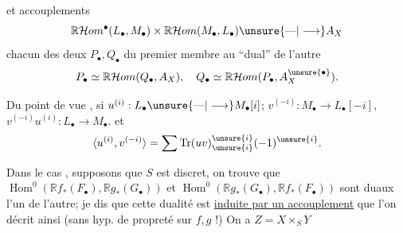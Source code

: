 
et  accouplements 
\[
\mathbb{R}\mathcal{H}om^\bullet(L_\bullet,M_\bullet)\times\mathbb{R}\mathcal{H}om(M_\bullet,L_\bullet)\unsure{\text{---}|\longrightarrow}A_X
\]
 chacun des deux  $P_\bullet,Q_\bullet$ du premier membre au ``dual'' de l'autre
\[
P_\bullet\simeq\mathbb{R}\mathcal{H}om(Q_\bullet,A_X),\quad Q_\bullet\simeq\mathbb{R}\mathcal{H}om(P_\bullet,A_X^{\unsure{\bullet}}).
\]

Du point de vue , si $u^{(i)}:L_\bullet\unsure{\text{---}|\longrightarrow}M_\bullet[i]$;
$v^{(-i)}:M_\bullet\longrightarrow L_\bullet[-i]$, 
$v^{(-i)}u^{(i)}:L_\bullet\longrightarrow M_\bullet$.
et
\[
\langle u^{(i)},v^{(-i)}\rangle=\sum\operatorname{Tr}(uv)_{\unsure{i}}^{\unsure{i}}(-1)^{\unsure{i}}.
\]

Dans le cas ,  supposons que $S$ est discret,
 on trouve
que $\operatorname{Hom}^{0}(\mathbb{R}f_*(F_\bullet),\mathbb{R}g_*(G_\bullet))$ et
$\operatorname{Hom}^{0}(\mathbb{R}g_*(G_\bullet),\mathbb{R}f_*(F_\bullet))$
sont duaux l'un de l'autre; je dis que cette dualité est \uline{induite par un accouplement}
que l'on décrit ainsi (sans hyp. de propreté sur $f,g$ !) On a $Z=X\times_S Y$
